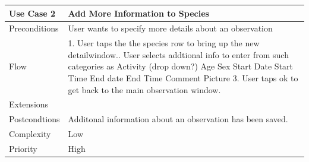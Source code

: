 \begin{tabular}[t]{|l|p{}|}\hline
	Use Case 2&Add More Information to Species\\\hline
	Preconditions&User wants to specify more details about an observation\\\hline
	Flow& 1. User taps the the species row to bring up the new detailwindow.\newline
	2. User selects addtional info to enter from such categories as \newline
	Activity (drop down?) \newline
	Age\newline
	Sex\newline
	Start Date\newline
	Start Time\newline
	End date \newline
	End Time \newline
	Comment \newline
	Picture \newline
	3. User taps ok to get back to the main observation window.\\\hline
	Extensions& \\\hline
	Postcondtions&Additonal information about an observation has been saved.\\\hline
	Complexity&Low\\\hline
	Priority&High\\\hline
\end{tabular}

\hspace{2em}

